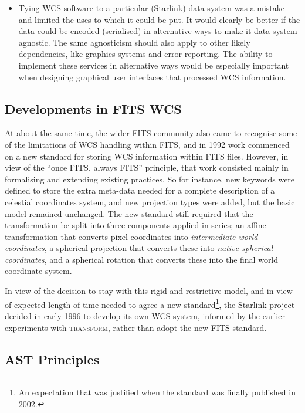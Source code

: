 \documentclass[final,authoryear,5p,times,twocolumn]{elsarticle}
\begin{document}
\begin{itemize}
\item Tying WCS software to a particular (Starlink) data system was a
  mistake and limited the uses to which it could be put. It would
  clearly be better if the data could be encoded (serialised) in
  alternative ways to make it data-system agnostic. The same
  agnosticism should also apply to other likely dependencies, like
  graphics systems and error reporting.  The ability to implement
  these services in alternative ways would be especially important
  when designing graphical user interfaces that processed WCS
  information.

\end{itemize}

\subsection{Developments in FITS WCS}

At about the same time, the wider FITS community also came to recognise
some of the limitations of WCS handling within FITS, and in 1992 work commenced
on a new standard for storing WCS information within FITS files. However,
in view of the ``once FITS, always FITS'' principle, that work consisted
mainly in formalising and extending existing practices. So for instance, new
keywords were defined to store the extra meta-data needed for a complete
description of a celestial coordinates system, and new projection types were
added, but the basic model remained unchanged. The new standard still required
that the transformation be split into three components applied in series; an
affine transformation that converts pixel coordinates into \emph{intermediate
world coordinates}, a spherical projection that converts these into \emph{native
spherical coordinates}, and a spherical rotation that converts these into the
final world coordinate system.

In view of the decision to stay with this rigid and restrictive model,
and in view of expected length of time needed to agree a new standard\footnote{An
expectation that was justified when the standard was finally published in 2002.},
the Starlink project decided in early 1996 to develop its own WCS system, informed
by the earlier experiments with \textsc{transform}, rather than adopt the new FITS
standard.

\subsection{AST Principles}
\end{document}
